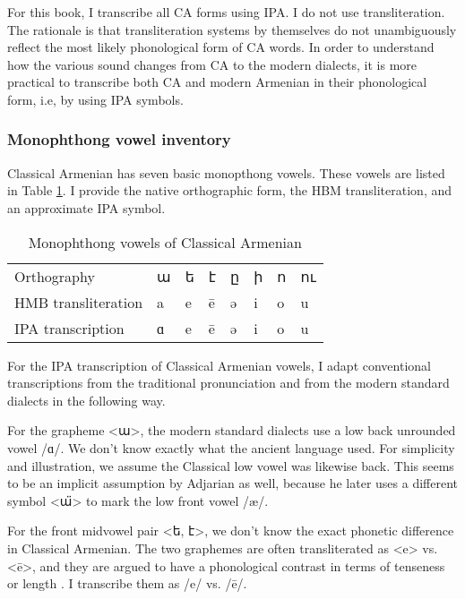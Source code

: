 For this book, I transcribe all CA forms using IPA. I do not use transliteration. The rationale is that transliteration systems by themselves do not unambiguously reflect the most likely phonological form of CA words. In order to understand how the various sound changes from CA to the modern dialects, it is more practical to transcribe both CA and modern Armenian in their phonological form, i.e, by using IPA symbols. 
\subsubsection{Monophthong vowel inventory}

Classical Armenian has seven basic monopthong vowels. These vowels are listed in Table \ref{tab:HossepIntr:classicalVowel}. I provide the native orthographic form, the HBM transliteration, and an approximate IPA symbol. 



\begin{table}[H]
	\centering
	\caption{Monophthong vowels of Classical Armenian}
	\label{tab:HossepIntr:classicalVowel}
	\begin{tabular}{|l|lllllll|}
		\hline 
		Orthography & ա & ե &  է & ը& ի & ո & ու\\
		HMB transliteration & a & e & ē & ə & i & o & u  \\
		IPA transcription & ɑ & e & ē  & ə & i & o & u  
		\\ \hline
	\end{tabular}
\end{table}



For the IPA transcription of Classical Armenian vowels, I adapt conventional transcriptions from the traditional pronunciation and from the modern standard dialects in the following way. 


For the grapheme <ա>, the modern standard dialects use a low back unrounded vowel /ɑ/. We don't know exactly what the ancient language used. For simplicity and illustration, we assume the Classical low vowel was likewise back. This seems to be an implicit assumption by Adjarian as well, because he later uses a different symbol <ա̈> to mark the low front vowel /æ/. 

For the front midvowel pair <ե, է>, we don't know the exact  phonetic difference in Classical Armenian. The two graphemes are often transliterated as <e> vs. <ē>, and they are argued to have a phonological contrast in terms of tenseness \cite[14]{Thomson-1989-IntroClassicalArmenian} or length  \citep[6]{Godel-1975-IntroClassicalArmenian}. I transcribe them as /e/ vs. /ē/. 


